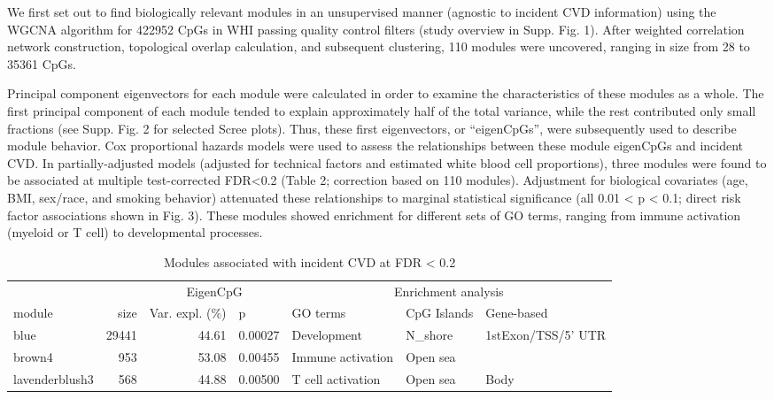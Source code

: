 \documentclass[]{article}
\theoremstyle{definition}
\theoremstyle{definition}
\theoremstyle{definition}
\theoremstyle{remark}
\begin{document}
We first set out to find biologically relevant modules in an
unsupervised manner (agnostic to incident CVD information) using the
WGCNA algorithm for 422952 CpGs in WHI passing quality control filters
(study overview in Supp. Fig. 1). After weighted correlation network
construction, topological overlap calculation, and subsequent
clustering, 110 modules were uncovered, ranging in size from 28 to 35361
CpGs.

Principal component eigenvectors for each module were calculated in
order to examine the characteristics of these modules as a whole. The
first principal component of each module tended to explain approximately
half of the total variance, while the rest contributed only small
fractions (see Supp. Fig. 2 for selected Scree plots). Thus, these first
eigenvectors, or ``eigenCpGs'', were subsequently used to describe
module behavior. Cox proportional hazards models were used to assess the
relationships between these module eigenCpGs and incident CVD. In
partially-adjusted models (adjusted for technical factors and estimated
white blood cell proportions), three modules were found to be associated
at multiple test-corrected FDR\textless{}0.2 (Table 2; correction based
on 110 modules). Adjustment for biological covariates (age, BMI,
sex/race, and smoking behavior) attenuated these relationships to
marginal statistical significance (all 0.01 \textless{} p \textless{}
0.1; direct risk factor associations shown in Fig. 3). These modules
showed enrichment for different sets of GO terms, ranging from immune
activation (myeloid or T cell) to developmental processes.

\begin{table}

\caption{\label{tab:sig-module-table}Modules associated with incident CVD at FDR < 0.2}
\centering
\begin{tabular}[t]{lrrllll}
\toprule
\multicolumn{1}{c}{} & \multicolumn{1}{c}{} & \multicolumn{2}{c}{EigenCpG} & \multicolumn{3}{c}{Enrichment analysis} \\
\cmidrule(l{2pt}r{2pt}){3-4} \cmidrule(l{2pt}r{2pt}){5-7}
module & size & Var. expl. (\%) & p & GO terms & CpG Islands & Gene-based\\
\midrule
blue & 29441 & 44.61 & 0.00027 & Development & N\_shore & 1stExon/TSS/5' UTR\\
brown4 & 953 & 53.08 & 0.00455 & Immune activation & Open sea & \\
lavenderblush3 & 568 & 44.88 & 0.00500 & T cell activation & Open sea & Body\\
\bottomrule
\end{tabular}
\end{table}
\end{document}

